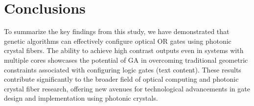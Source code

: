 \documentclass{article}
\begin{document}
\section*{Conclusions}
To summarize the key findings from this study, we have demonstrated that genetic algorithms can effectively configure optical OR gates using photonic crystal fibers. The ability to achieve high contrast outputs even in systems with multiple cores showcases the potential of GA in overcoming traditional geometric constraints associated with configuring logic gates (text content). These results contribute significantly to the broader field of optical computing and photonic crystal fiber research, offering new avenues for technological advancements in gate design and implementation using photonic crystals.
\end{document}

